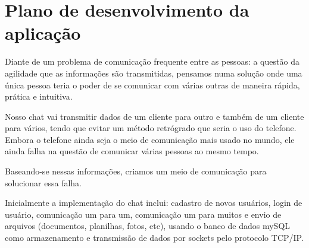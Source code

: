 \newpage
\section{Plano de desenvolvimento da aplicação}
Diante de um problema de comunicação frequente entre as pessoas: a questão da agilidade que as informações são transmitidas, pensamos numa solução onde uma única pessoa teria o poder de se comunicar com várias outras de maneira rápida, prática e intuitiva.

Nosso chat vai transmitir dados de um cliente para outro e também de um cliente para vários, tendo que evitar um método retrógrado que seria o uso do telefone. Embora o telefone ainda seja o meio de comunicação mais usado no mundo, ele ainda falha na questão de comunicar várias pessoas ao mesmo tempo.

Baseando-se nessas informações, criamos um meio de comunicação para solucionar essa falha.

Inicialmente a implementação do chat inclui: cadastro de novos usuários, login de usuário, comunicação um para um, comunicação um para muitos e envio de arquivos (documentos, planilhas, fotos, etc), usando o banco de dados mySQL como armazenamento e transmissão de dados por sockets pelo protocolo TCP/IP.